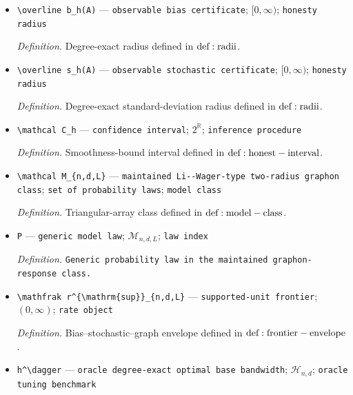 \documentclass{article}
\begin{document}
\begin{itemize}
  \par\smallskip\noindent\emph{Definition.} Estimator defined in \({\rm def:estimator}\).
  \item \texttt{\textbackslash{}\allowbreak{}overline b\_\allowbreak{}h(A)} --- \texttt{observable bias certificate}; \([0,\infty)\); \texttt{honesty radius}
  \par\smallskip\noindent\emph{Definition.} Degree-exact radius defined in \({\rm def:radii}\).
  \item \texttt{\textbackslash{}\allowbreak{}overline s\_\allowbreak{}h(A)} --- \texttt{observable stochastic certificate}; \([0,\infty)\); \texttt{honesty radius}
  \par\smallskip\noindent\emph{Definition.} Degree-exact standard-deviation radius defined in \({\rm def:radii}\).
  \item \texttt{\textbackslash{}\allowbreak{}mathcal C\_\allowbreak{}h} --- \texttt{confidence interval}; \(2^{\mathbb R}\); \texttt{inference procedure}
  \par\smallskip\noindent\emph{Definition.} Smoothness-bound interval defined in \({\rm def:honest-interval}\).
  \item \texttt{\textbackslash{}\allowbreak{}mathcal M\_\allowbreak{}\{n,\allowbreak{}d,\allowbreak{}L\}\allowbreak{}} --- \texttt{maintained Li-\allowbreak{}-\allowbreak{}Wager-\allowbreak{}type two-\allowbreak{}radius graphon class}; \texttt{set of probability laws}; \texttt{model class}
  \par\smallskip\noindent\emph{Definition.} Triangular-array class defined in \({\rm def:model-class}\).
  \item \texttt{P} --- \texttt{generic model law}; \(\mathcal M_{n,d,L}\); \texttt{law index}
  \par\smallskip\noindent\emph{Definition.} \texttt{Generic probability law in the maintained graphon-\allowbreak{}response class.}
  \item \texttt{\textbackslash{}\allowbreak{}mathfrak r\textasciicircum{}\{\textbackslash{}\allowbreak{}mathrm\{sup\}\allowbreak{}\}\allowbreak{}\_\allowbreak{}\{n,\allowbreak{}d,\allowbreak{}L\}\allowbreak{}} --- \texttt{supported-\allowbreak{}unit frontier}; \((0,\infty)\); \texttt{rate object}
  \par\smallskip\noindent\emph{Definition.} Bias--stochastic--graph envelope defined in \({\rm def:frontier-envelope}\).
  \item \texttt{h\textasciicircum{}\textbackslash{}\allowbreak{}dagger} --- \texttt{oracle degree-\allowbreak{}exact optimal base bandwidth}; \(\mathcal H_{n,d}\); \texttt{oracle tuning benchmark}

\end{itemize}
\end{document}

